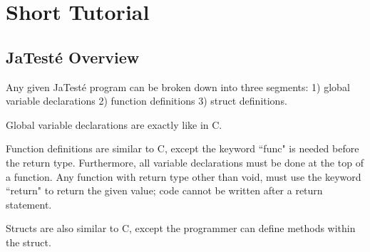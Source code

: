 \documentclass{article}
\begin{document}
\newpage

\section{Short Tutorial}
\subsection{JaTest\'{e} Overview}
Any given JaTest\'{e} program can be broken down into three segments: 1) global variable declarations 2) function definitions 3) struct definitions. 
\par
Global variable declarations are exactly like in C. 
\par
Function definitions are similar to C, except the keyword ``func" is needed before the return type. Furthermore, all variable declarations must be done at the top of a function. Any function with return type other than void, must use the keyword ``return" to return the given value; code cannot be written after a return statement. 
\par
Structs are also similar to C, except the programmer can define methods within the struct. 
\end{document}
